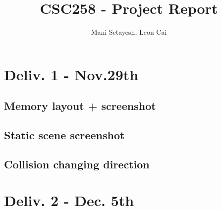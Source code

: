\documentclass{article}
\author{Mani Setayesh, Leon Cai}
\title{CSC258 - Project Report}
\begin{document}
\maketitle
\section*{Deliv. 1 - Nov.29th}
\subsection*{Memory layout + screenshot}
\subsection*{Static scene screenshot}
\subsection*{Collision changing direction}
\section*{Deliv. 2 - Dec. 5th}
\end{document}
